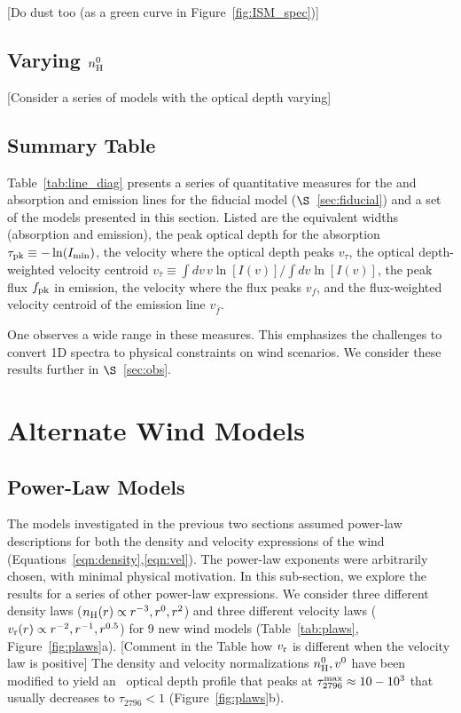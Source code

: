 \documentclass[12pt,preprint]{aastex}
\begin{document}
[Do dust too (as a green curve in Figure~\ref{fig:ISM_spec})]

\subsection{Varying $n_{\rm H}^0$}

[Consider a series of models with the optical depth varying]

\subsection{Summary Table}

Table~\ref{tab:line_diag} presents a series of quantitative measures
for the  and  absorption and emission lines for
the fiducial model ($\S$~\ref{sec:fiducial}) and a set of the models
presented in this section.  Listed are the
equivalent widths (absorption and emission), the peak optical depth
for the absorption $\tau_{\rm pk} \equiv -\ln(I_{\rm min})$, the
velocity where the optical depth peaks $v_\tau$, the optical
depth-weighted velocity centroid $v_{\bar \tau} \equiv \int dv \, v
\ln[I(v)] / \int dv \ln[I(v)]$, the peak flux $f_{\rm pk}$ in
emission, the velocity where the flux peaks $v_f$, and the
flux-weighted velocity centroid of the emission line $v_{\bar f}$.

One observes a wide range in these measures.  This emphasizes the
challenges to convert 1D spectra to physical
constraints on wind scenarios.  We consider these
results further in $\S$~\ref{sec:obs}.

\section{Alternate Wind Models}
\label{sec:alternate}

\subsection{Power-Law Models}
\label{sec:power}

The models investigated in the previous two sections
assumed power-law descriptions for both the density and velocity
expressions of the wind (Equations~\ref{eqn:density},\ref{eqn:vel}).
The power-law exponents were arbitrarily chosen, with minimal physical
motivation.  In this sub-section, we explore the results for a series
of other power-law expressions.
We consider three different density laws ($n_{\rm H}(r) \propto
r^{-3}, r^{0}, r^2$) and three different velocity laws ($v_{\rm r}(r)
\propto r^{-2}, r^{-1}, r^{0.5}$) for 9 new wind models
(Table~\ref{tab:plaws}, Figure~\ref{fig:plaws}a).  [Comment in the Table how $v_{\rm r}$ is
different when the velocity law is positive]  
The density and velocity normalizations $n_{\rm H}^0, v^0$ have been
modified to yield an \mgiia\ optical depth profile that peaks at
$\tau_{2796}^{\rm max} \approx 10-10^3$ that usually decreases to
$\tau_{2796} < 1$ (Figure~\ref{fig:plaws}b).
\end{document}
